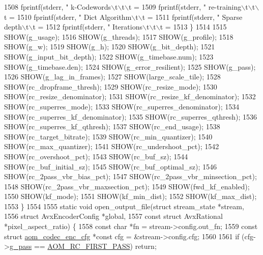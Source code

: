 \begin{DoxyCodeInclude}
{{{{{{{{{{{{{{{{{{{{{{{{{{{{{{{1508     fprintf(stderr, \textcolor{stringliteral}{"    k-Codewords\(\backslash\)t\(\backslash\)t\(\backslash\)t = %
1509     fprintf(stderr, \textcolor{stringliteral}{"    re-training\(\backslash\)t\(\backslash\)t\(\backslash\)t = %
1510     fprintf(stderr, \textcolor{stringliteral}{"    Dict Algorithm\(\backslash\)t\(\backslash\)t = %
1511     fprintf(stderr, \textcolor{stringliteral}{"    Sparse depth\(\backslash\)t\(\backslash\)t = %
1512     fprintf(stderr, \textcolor{stringliteral}{"    Iterations\(\backslash\)t\(\backslash\)t\(\backslash\)t = %
1513   \}
1514 
1515   SHOW(g\_usage);
1516   SHOW(g\_threads);
1517   SHOW(g\_profile);
1518   SHOW(g\_w);
1519   SHOW(g\_h);
1520   SHOW(g\_bit\_depth);
1521   SHOW(g\_input\_bit\_depth);
1522   SHOW(g\_timebase.num);
1523   SHOW(g\_timebase.den);
1524   SHOW(g\_error\_resilient);
1525   SHOW(g\_pass);
1526   SHOW(g\_lag\_in\_frames);
1527   SHOW(large\_scale\_tile);
1528   SHOW(rc\_dropframe\_thresh);
1529   SHOW(rc\_resize\_mode);
1530   SHOW(rc\_resize\_denominator);
1531   SHOW(rc\_resize\_kf\_denominator);
1532   SHOW(rc\_superres\_mode);
1533   SHOW(rc\_superres\_denominator);
1534   SHOW(rc\_superres\_kf\_denominator);
1535   SHOW(rc\_superres\_qthresh);
1536   SHOW(rc\_superres\_kf\_qthresh);
1537   SHOW(rc\_end\_usage);
1538   SHOW(rc\_target\_bitrate);
1539   SHOW(rc\_min\_quantizer);
1540   SHOW(rc\_max\_quantizer);
1541   SHOW(rc\_undershoot\_pct);
1542   SHOW(rc\_overshoot\_pct);
1543   SHOW(rc\_buf\_sz);
1544   SHOW(rc\_buf\_initial\_sz);
1545   SHOW(rc\_buf\_optimal\_sz);
1546   SHOW(rc\_2pass\_vbr\_bias\_pct);
1547   SHOW(rc\_2pass\_vbr\_minsection\_pct);
1548   SHOW(rc\_2pass\_vbr\_maxsection\_pct);
1549   SHOW(fwd\_kf\_enabled);
1550   SHOW(kf\_mode);
1551   SHOW(kf\_min\_dist);
1552   SHOW(kf\_max\_dist);
1553 \}
1554 
1555 \textcolor{keyword}{static} \textcolor{keywordtype}{void} open\_output\_file(\textcolor{keyword}{struct} stream\_state *stream,
1556     \textcolor{keyword}{struct} AvxEncoderConfig *global,
1557     \textcolor{keyword}{const} \textcolor{keyword}{struct} AvxRational *pixel\_aspect\_ratio) \{
1558   \textcolor{keyword}{const} \textcolor{keywordtype}{char} *fn = stream->config.out\_fn;
1559   \textcolor{keyword}{const} \textcolor{keyword}{struct }\hyperlink{structaom__codec__enc__cfg}{aom\_codec\_enc\_cfg} *\textcolor{keyword}{const} cfg = &stream->config.cfg;
1560 
1561   \textcolor{keywordflow}{if} (cfg->\hyperlink{structaom__codec__enc__cfg_aad58e4d10c7904d50ce959aef202dc64}{g\_pass} == \hyperlink{group__encoder_gga92b6709b58dc3435e3ba652da562eda1ad342b33a290482c20238bfde5d9bea1e}{AOM\_RC\_FIRST\_PASS}) \textcolor{keywordflow}{return};
}}}}}}}}}}}}}}}}}}}}}}}}}}}}}}}}}}}}
\end{DoxyCodeInclude}
